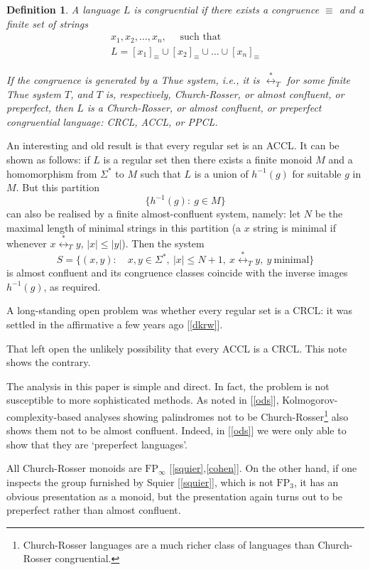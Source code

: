 \documentclass[12pt,a4paper]{article}
\newtheorem{definition}[theorem]{Definition}
\newcommand{\thuecong}{{\overset{*}{\leftrightarrow}}}
\numberwithin{equation}{section}
\newcommand{\be}{\begin{equation*}}
\newcommand{\ee}{\end{equation*}}
\begin{document}
\begin{definition}
\label{def: congruential language}
A language $L$ is {\em congruential} if there exists
a congruence $\equiv$ and a finite set of strings
\begin{gather*}
 x_1, x_2, \ldots, x_n,\quad\text{ such that}\\
L = [x_1]_\equiv \cup
[x_2]_\equiv \cup \ldots \cup [x_n]_\equiv
\end{gather*}

If the congruence is generated by a Thue system,
i.e., it is ${\thuecong}_T$ for some finite Thue system $T$,
and $T$ is, respectively, Church-Rosser, or almost confluent,
or preperfect, then $L$ is a Church-Rosser, or almost confluent,
or preperfect congruential language: {\em CRCL, ACCL}, or {\em PPCL}.
\end{definition}

An interesting and  old result is that every regular set is
an ACCL.  It can be shown as follows:
if $L$ is a regular set then there exists
a finite monoid $M$ and a homomorphism from
$\Sigma^*$ to $M$ such that $L$ is a union
of $h^{-1}(g)$ for suitable $g$ in $M$.
But this partition 
\be
\{h^{-1}(g): ~ g \in M\}
\ee
can also be realised by a finite almost-confluent
system, namely: let $N$ be the maximal length of minimal
strings in this partition (a $x$ string is minimal
if whenever $x {\thuecong}_T y$, $|x| \leq |y|$).
Then the system
\be
S =\{(x,y):\quad x,y\in \Sigma^*,~
|x| \leq N+1,~ x{\thuecong}_T y,~ y ~ \text{minimal} \}
\ee
is almost confluent and its congruence classes
coincide with the inverse images $h^{-1}(g)$, as required.

A long-standing open problem was
whether every regular set is a CRCL:  it was
settled in the affirmative a few years ago
[\ref{dkrw}].

That left open the unlikely possibility
that every ACCL is a CRCL.  This note shows
the contrary.

The analysis in this paper is simple and direct.
In fact, the problem is not susceptible to more
sophisticated methods.  As noted in [\ref{ods}],
Kolmogorov-complexity-based analyses showing
palindromes not to be Church-Rosser\footnote{Church-Rosser
languages are a much richer class of languages than
Church-Rosser congruential.} also shows them not
to be almost confluent.  Indeed, in [\ref{ods}] we were only able to
show that they are `preperfect languages'.

All Church-Rosser monoids  are $\text{FP}_\infty$ [\ref{squier},\ref{cohen}].
On the other hand, if one inspects
the group furnished by Squier [\ref{squier}],
which is not $\text{FP}_3$, it has an obvious presentation
as a monoid, but the presentation again turns out to be
preperfect rather than almost confluent.
\end{document}
